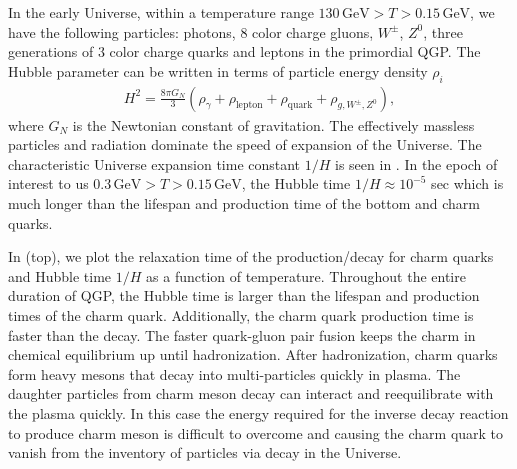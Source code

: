  

In the early Universe, within a temperature range $130\, \mathrm{GeV}>T>0.15\,\mathrm{GeV}$,  we have the following particles:  photons, $8$ color charge gluons, $W^\pm$, $Z^0$, three generations of $3$ color charge quarks and leptons in the primordial QGP.  The Hubble parameter can be written in terms of particle energy density $\rho_i$
\begin{align}
H^2=\frac{8\pi G_N}{3}\left(\rho_\gamma+\rho_{\mathrm{lepton}}+\rho_{\mathrm{quark}}+\rho_{g,{W^\pm},{Z^0}}\right),
\end{align}
where $G_N$ is the Newtonian constant of gravitation. The effectively massless particles and radiation dominate the speed of expansion of the Universe. The characteristic Universe expansion time constant $1/H$ is seen in . In the epoch of interest to us $0.3\,\mathrm{GeV}>T>0.15\,\mathrm{GeV}$, the Hubble time $1/H\approx10^{-5}$ sec which is much longer than the lifespan and production time of the bottom and charm quarks. 

In  (top), we plot the relaxation time of the production/decay for charm quarks and Hubble time $1/H$ as a function of temperature. Throughout the entire duration of QGP, the Hubble time is larger than the lifespan and production times of the charm quark. %
Additionally, the charm quark production time is faster than the decay. The faster quark-gluon pair fusion keeps the charm in chemical equilibrium up until hadronization. After hadronization, charm quarks form heavy mesons that decay into multi-particles quickly in plasma. The daughter particles from charm meson decay can interact and reequilibrate with
the plasma quickly. In this case the energy required for the inverse decay reaction to produce
charm meson is difficult to overcome and causing the charm quark to vanish from the inventory of particles via decay in the Universe.

